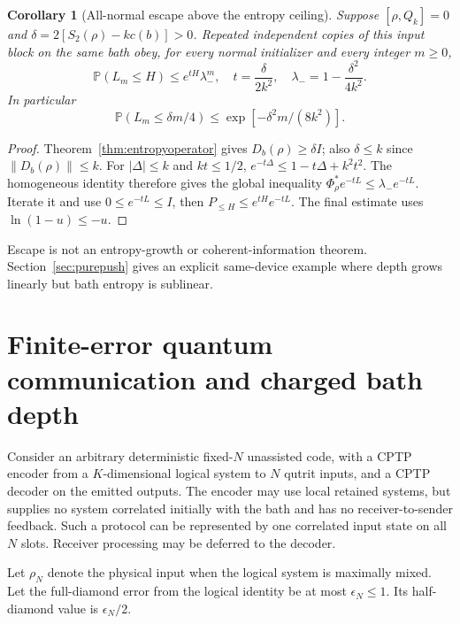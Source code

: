 \documentclass[11pt]{article}
\newtheorem{corollary}[theorem]{Corollary}
\newcommand{\norm}[1]{\lVert #1\rVert}
\newcommand{\Prob}{\mathbb P}
\begin{document}
\begin{corollary}[All-normal escape above the entropy ceiling]
\label{cor:escape}
Suppose \([\rho,Q_k]=0\) and
\(\delta=2[S_2(\rho)-kc(b)]>0\).
Repeated independent copies of this input block on the same bath obey,
for every normal initializer and every integer \(m\ge0\),
\[
 \Prob(L_m\le H)\le e^{tH}\lambda_-^m,\quad
 t=\frac{\delta}{2k^2},\quad
 \lambda_-=1-\frac{\delta^2}{4k^2}.
\]
In particular
\[
 \Prob(L_m\le\delta m/4)
 \le \exp[-\delta^2m/(8k^2)].
\]
\end{corollary}
\begin{proof}
Theorem~\ref{thm:entropyoperator} gives \(D_b(\rho)\ge\delta I\);
also \(\delta\le k\) since \(\norm{D_b(\rho)}\le k\).
For \(|\Delta|\le k\) and \(kt\le1/2\),
\(e^{-t\Delta}\le1-t\Delta+k^2t^2\).
The homogeneous identity therefore gives the global inequality
\(\Phi_\rho^*e^{-tL}\le\lambda_-e^{-tL}\).
Iterate it and use \(0\le e^{-tL}\le I\), then
\(P_{\le H}\le e^{tH}e^{-tL}\).
The final estimate uses \(\ln(1-u)\le-u\).
\end{proof}

Escape is not an entropy-growth or coherent-information theorem.
Section~\ref{sec:purepush} gives an explicit same-device example where
depth grows linearly but bath entropy is sublinear.

\section{Finite-error quantum communication and charged bath depth}

Consider an arbitrary deterministic fixed-\(N\) unassisted code, with a
CPTP encoder from a \(K\)-dimensional logical system to \(N\) qutrit
inputs, and a CPTP decoder on the emitted outputs. The encoder may use
local retained systems, but supplies no system correlated initially
with the bath and has no receiver-to-sender feedback. Such a protocol
can be represented by one correlated input state on all \(N\) slots.
Receiver processing may be deferred to the decoder.

Let \(\rho_N\) denote the physical input when the logical system is
maximally mixed. Let the full-diamond error from the logical identity
be at most \(\epsilon_N\le1\). Its half-diamond value is
\(\epsilon_N/2\).
\end{document}

